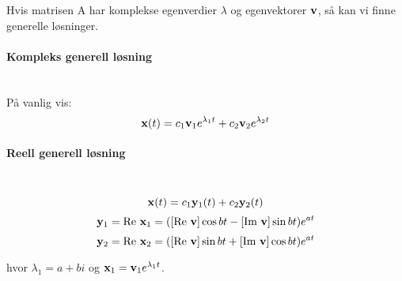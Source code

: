 Hvis matrisen A har komplekse egenverdier $\lambda$ og egenvektorer $\mathbf{v}$,
så kan vi finne generelle løsninger.



\paragraph{Kompleks generell løsning} \hfill \\
På vanlig vis:
$$\mathbf{x}(t) = c_1\mathbf{v}_1e^{\lambda_1t} + c_2\mathbf{v}_2e^{\lambda_2t}$$



\paragraph{Reell generell løsning} \hfill \\
$$\mathbf{x}(t) = c_1\mathbf{y}_1(t) + c_2\mathbf{y}_2(t)$$
$$\mathbf{y}_1 = \text{Re}\ \mathbf{x}_1
          = ([\text{Re}\ \mathbf{v}]\cos{bt} - [\text{Im}\ \mathbf{v}]\sin{bt})e^{at}$$
$$\mathbf{y}_2 = \text{Re}\ \mathbf{x}_2
          = ([\text{Re}\ \mathbf{v}]\sin{bt} + [\text{Im}\ \mathbf{v}]\cos{bt})e^{at}$$

hvor $\lambda_1 = a + bi$ og $\mathbf{x}_1 = \mathbf{v}_1e^{\lambda_1t}$.
